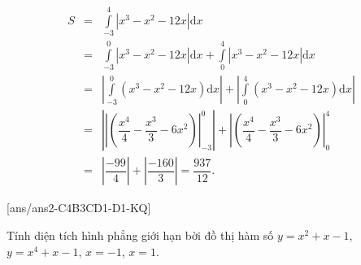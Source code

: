 \begin{ex}
{\begin{itemchoice}
\begin{eqnarray*}
	S&=&\displaystyle\int\limits_{-3}^4\left|x^3-x^2-12x\right| \mathrm{d}x
	\\&=&\displaystyle\int\limits_{-3}^0\left|x^3-x^2-12x\right| \mathrm{d}x+\displaystyle\int\limits_0^4\left|x^3-x^2-12 x\right| \mathrm{d}x 
	\\&=&\left|\displaystyle\int\limits_{-3}^0\left(x^3-x^2-12 x\right) \mathrm{d}x\right|+\left|\displaystyle\int\limits_0^4\left(x^3-x^2-12 x\right) \mathrm{d}x\right|
	\\&=&\left| \left|\left(\dfrac{x^4}{4}-\dfrac{x^3}{3}-6 x^2\right)\right|_{-3}^0\right| +\left| \left(\dfrac{x^4}{4}-\dfrac{x^3}{3}-6 x^2\right)\right|_0^4
	\\&=&\left|\dfrac{-99}{4}\right|+\left|\dfrac{-160}{3}\right|=\dfrac{937}{12}.
\end{eqnarray*}
\end{itemchoice}
}
\end{ex}
\TN
{}[ans/ans2-C4B3CD1-D1-KQ]
\begin{ex}%
	Tính diện tích hình phẳng giới hạn bời đồ thị hàm số $y=x^2+x-1$, $y=x^4+x-1$, $x=-1$, $x=1$.
\end{ex}

